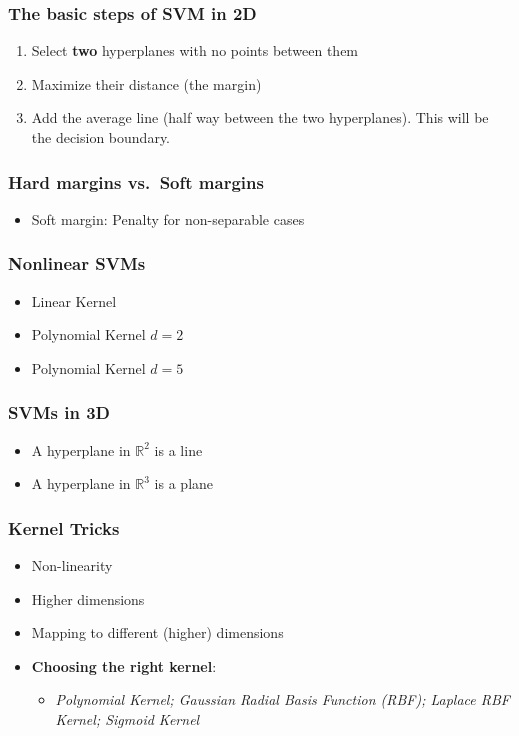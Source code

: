 \documentclass{article}
\begin{document}
\subsubsection*{The basic steps of SVM in 2D}
\begin{enumerate}
    \item Select \textbf{two} hyperplanes with no points between them
    \item Maximize their distance (the margin)
    \item Add the average line (half way between the two hyperplanes). This will be the decision boundary.
\end{enumerate}
\subsubsection*{Hard margins vs.\ Soft margins}
\begin{itemize}
    \item Soft margin: Penalty for non-separable cases
\end{itemize}
\subsubsection*{Nonlinear SVMs}
\begin{itemize}
    \item Linear Kernel
    \item Polynomial Kernel $d = 2$
    \item Polynomial Kernel $d = 5$
\end{itemize}
\subsubsection*{SVMs in 3D}
\begin{itemize}
    \item A hyperplane in $\mathbb{R}^2$ is a line 
    \item A hyperplane in $\mathbb{R}^3$ is a plane
\end{itemize}
\subsubsection*{Kernel Tricks}
\begin{itemize}
    \item Non-linearity
    \item Higher dimensions
    \item Mapping to different (higher) dimensions
    \item \textbf{Choosing the right kernel}:
    \begin{itemize}
        \item \emph{Polynomial Kernel; Gaussian Radial Basis Function (RBF); Laplace RBF Kernel; Sigmoid Kernel}
    \end{itemize}
\end{itemize}
\end{document}
